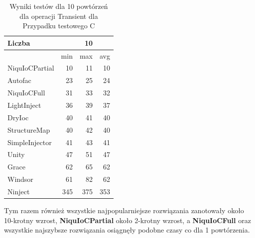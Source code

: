 \documentclass[12pt]{article}
\begin{document}
\begin{table}[H]
\captionsetup{belowskip=0pt,aboveskip=0pt}
\begin{center}
\begin{small}
	\begin{tabular}{ | l | r r r | }
    		\hline
Liczba & & 10 & \\ \hline
 & min & max & avg \\ \hline
NiquIoCPartial & 10 & 11 & 10 \\ \hline
Autofac & 23 & 25 & 24 \\ \hline
NiquIoCFull & 31 & 33 & 32 \\ \hline
LightInject & 36 & 39 & 37 \\ \hline
DryIoc & 40 & 41 & 40 \\ \hline
StructureMap & 40 & 42 & 40 \\ \hline
SimpleInjector & 41 & 43 & 41 \\ \hline
Unity & 47 & 51 & 47 \\ \hline
Grace & 62 & 65 & 62 \\ \hline
Windsor & 61 & 82 & 62 \\ \hline
Ninject & 345 & 375 & 353 \\ \hline
  	\end{tabular}
\end{small}
\end{center}
\caption{Wyniki testów dla 10 powtórzeń dla operacji Transient dla Przypadku testowego C}
\label{TestCaseC_Transient10}
\end{table}
Tym razem również wszystkie najpopularniejsze rozwiązania zanotowały około 10-krotny wzrost, \textbf{NiquIoCPartial} około 2-krotny wzrost, a \textbf{NiquIoCFull} oraz wszystkie najszybsze rozwiązania osiągnęły podobne czasy co dla 1 powtórzenia.
\\ \\
\end{document}
